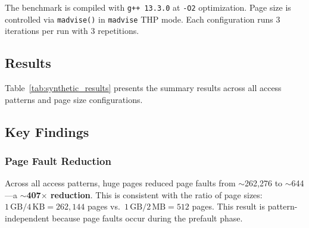 \documentclass[conference]{IEEEtran}
\begin{document}
The benchmark is compiled with \texttt{g++ 13.3.0} at \texttt{-O2} optimization. Page size is controlled via \texttt{madvise()} in \texttt{madvise} THP mode. Each configuration runs 3 iterations per run with 3 repetitions.

\subsection{Results}

Table~\ref{tab:synthetic_results} presents the summary results across all access patterns and page size configurations.

\begin{table}[H]
\centering
\caption{Synthetic Workload Results Summary}
\label{tab:synthetic_results}
\end{table}

\subsection{Key Findings}

\subsubsection{Page Fault Reduction}
Across all access patterns, huge pages reduced page faults from $\sim$262,276 to $\sim$644---a \textbf{$\sim$407$\times$ reduction}. This is consistent with the ratio of page sizes: $1\,\text{GB} / 4\,\text{KB} = 262{,}144$ pages vs.\ $1\,\text{GB} / 2\,\text{MB} = 512$ pages. This result is pattern-independent because page faults occur during the prefault phase.
\end{document}
